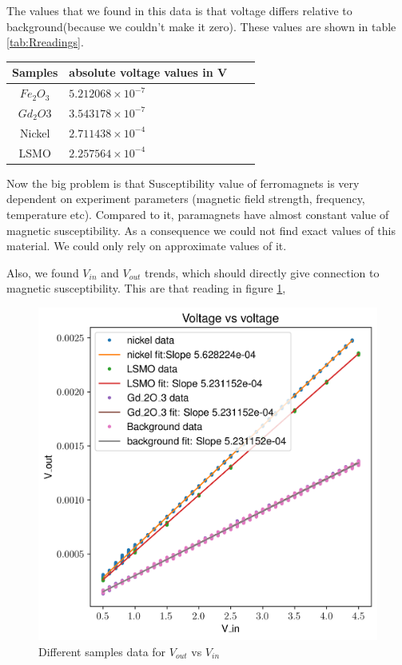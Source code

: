 The values that we found in this data is that voltage differs relative to background(because we couldn’t make it zero). These values are shown in table \ref{tab:Rreadings}.
\noindent\setlength\tabcolsep{4pt}%
\begin{center}
\begin{tabularx}{.83\linewidth}{| c |Y| c |Y  }
  \hline
  \hline
  Samples & absolute voltage values in V \\
  \hline
  $Fe_2O_3$ & $5.212068 \times 10^{-7}$ \\
  $Gd_2O3$ & $3.543178\times 10^{-7}$ \\
  Nickel & $2.711438 \times 10^{-4}$ \\
LSMO &  $2.257564 \times 10^{-4}$\\
\hline
\hline
\end{tabularx}
\label{tab:Rreadings}
\vskip1cm
\end{center}

Now the big problem is that Susceptibility value of ferromagnets is very dependent on experiment parameters (magnetic field strength, frequency, temperature etc). Compared to it, paramagnets have almost constant value of magnetic susceptibility. As a consequence we could not find exact values of this material. We could only rely on approximate values of it. 

Also, we found $V_{in}$ and $V_{out}$ trends, which should directly give connection to magnetic susceptibility. This are that reading in figure \ref{fig:voltage},

\begin{figure}[hbt!]
  \includegraphics[width= \linewidth]{plots/voltage.png}
  \caption{Different samples data for $V_{out}$ vs $V_{in}$}
  \label{fig:voltage}
\end{figure}

